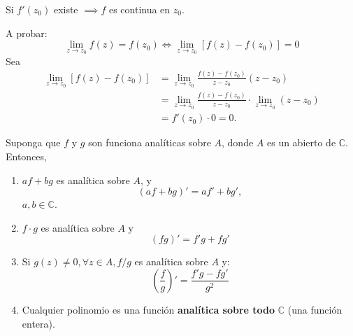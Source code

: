 \begin{teorema}
    Si $f'(z_0)$ existe $\implies f$ es continua en $z_0$.
    \begin{dem}
        A probar: $$\lim_{z\to z_0}f(z)=f(z_0)\iff \lim_{z\to z_0}\left[f(z)-f(z_0)\right]=0$$
        Sea 
        \begin{align*}
            \lim_{z\to z_0}\left[f(z)-f(z_0)\right]&=\lim_{z\to z_0}\frac{f(z)-f(z_0)}{z-z_0}\left(z-z_0\right)\\
            &= \lim_{z\to z_0}\frac{f(z)-f(z_0)}{z-z_0}\cdot \lim_{z\to z_0}(z-z_0)\\
            &= f'(z_0)\cdot 0 = 0.
        \end{align*}
   
    \end{dem}
\end{teorema}

\begin{prop}
    Suponga que $f$ y $g$ son funciona analíticas sobre $A$, donde $A$ es un abierto de $\mathbb{C}$. Entonces, 
    \begin{enumerate}
        \item $af+bg$ es analítica sobre $A$, y
        $$(af+bg)' = af'+bg',$$
        $a,b\in\mathbb{C}$.
        \item $f\cdot g$ es analítica sobre $A$ y $$(fg)'=f'g+fg'$$
        \item Si $g(z)\neq 0,\forall z\in A, f/g$ es analítica sobre $A$ y: 
        $$\left(\frac{f}{g}\right)'=\frac{f'g-fg'}{g^2}$$
        \item Cualquier polinomio es una función \textbf{analítica sobre todo} $\mathbb{C}$ (una función entera). 
    \end{enumerate}
\end{prop}

